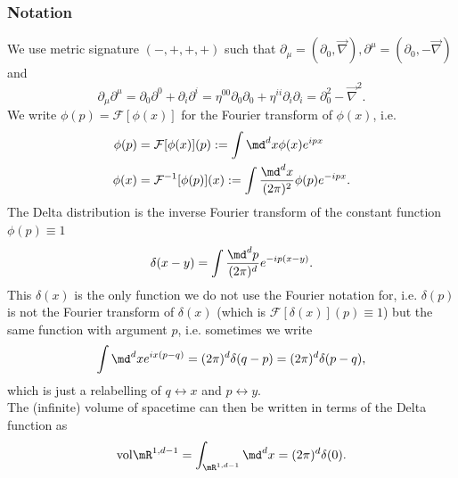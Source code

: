 \subsubsection{Notation}
We use metric signature $(-,+,+,+)$ such that $\partial_\mu = (\partial_0,\vec{\nabla}), \partial^\mu=(\partial_0,-\vec{\nabla})$ and
\begin{equation}
	\partial_\mu \partial^\mu = \partial_0 \partial^0 + \partial_i \partial^i = \eta^{00} \partial_0 \partial_0 + \eta^{ii} \partial_i \partial_i = \partial^2_0 - \vec{\nabla}^2.
\end{equation}
We write $\phi(p)=\mathcal{F}[\phi(x)]$ for the Fourier transform of $\phi(x)$, i.e.  
\begin{align}
	\phi(p) &= \mathcal{F}[\phi(x)] (p) := \int \md^d x \phi(x) e^{ipx} \\
	\phi(x) &= \mathcal{F}^{-1}[\phi(p)](x) := \int \frac{\md^d x}{(2 \pi)^2} \phi(p) e^{-ipx}.
\end{align}
The Delta distribution is the inverse Fourier transform  of the constant function $\phi(p) \equiv 1$
\begin{equation}
	\delta (x-y) =  \int \frac{\md^d p}{(2 \pi)^d} e^{-i p(x-y)}.
\end{equation}
This $\delta(x)$ is the only function we do not use the Fourier notation for, i.e. $\delta(p)$ is not the
Fourier transform of $\delta(x)$ (which is $\mathcal{F}[\delta(x)](p) ≡ 1$) but the same function with argument $p$, i.e.
sometimes we write
\begin{equation}
	\int \md^d x e^{i x(p-q)} = (2 \pi)^d \delta(q-p) = (2 \pi)^d \delta(p-q),
\end{equation}
which is just a relabelling of $q \leftrightarrow x$ and $p \leftrightarrow y$.\\
The (infinite) volume of spacetime can then be written in terms of the Delta function as
\begin{equation}
\mathrm{vol}\mR^{1,d-1} = \int_{\mR^{1,d-1}} \md^d x = (2 \pi)^d \delta(0).
\end{equation} 




